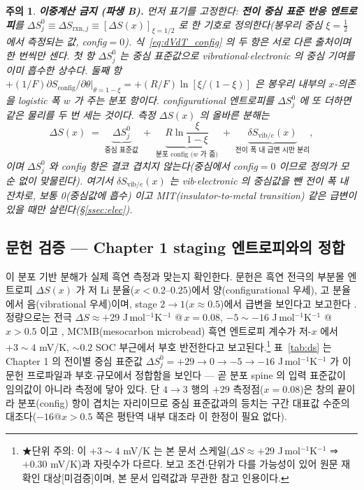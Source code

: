 \documentclass[11pt,a4paper]{article}
\newtheorem*{warnbox}{주의}
\newcommand{\rxn}{\mathrm{rxn}}
\newcommand{\config}{\mathrm{config}}
\newcommand{\vib}{\mathrm{vib}}
\begin{document}
\begin{warnbox}
\textbf{이중계산 금지 (파생 B).} 먼저 표기를 고정한다: \textbf{전이 중심 표준 반응 엔트로피}를
$\Delta S^0_j\equiv\Delta S_{\rxn,j}\equiv[\Delta S(x)]_{\xi=1/2}$ 로 한 기호로 정의한다(봉우리 중심 $\xi=\tfrac12$
에서 측정되는 값, config$=0$). 식~\eqref{eq:dVdT_config} 의 두 항은 \emph{서로 다른 출처}이며 한 번씩만 센다.
첫 항 $\Delta S^0_j$ 는 중심 표준값으로 vibrational$\cdot$electronic 의 중심 기여를 이미 흡수한 상수다. 둘째 항
$+(1/F)\partial S_\config/\partial\theta|_{\theta=1-\xi}=+(R/F)\ln[\xi/(1-\xi)]$ 은 봉우리 \emph{내부}의 $x$-의존을
logistic 폭 $w$ 가 주는 \emph{분포 항}이다. configurational 엔트로피를 $\Delta S^0_j$ 에 \emph{또} 더하면 같은
물리를 두 번 세는 것이다. 측정 $\Delta S(x)$ 의 올바른 분해는
\[
\Delta S(x) \;=\; \underbrace{\Delta S^0_j}_{\text{중심 표준값}}
\;+\;\underbrace{R\ln\frac{\xi}{1-\xi}}_{\text{분포 config (}w\text{ 가 줌)}}
\;+\;\underbrace{\delta S_{\vib/e}(x)}_{\text{전이 폭 내 급변 시만 분리}},
\]
이며 $\Delta S^0_j$ 와 config 항은 결코 겹치지 않는다(중심에서 config$=0$ 이므로 정의가 모순 없이 맞물린다).
여기서 $\delta S_{\vib/e}(x)$ 는 vib$\cdot$electronic 의 \emph{중심값을 뺀} 전이 폭 내 잔차로, 보통 0(중심값에 흡수)
이고 MIT(insulator-to-metal transition) 같은 급변이 있을 때만 살린다(\S\ref{ssec:elec}).
\end{warnbox}

\subsection{문헌 검증 — Chapter 1 staging 엔트로피와의 정합}
이 분포 기반 분해가 실제 흑연 측정과 맞는지 확인한다. 문헌은 흑연 전극의 부분몰 엔트로피 $\Delta S(x)$ 가
저 Li 분율($x<0.2$--$0.25$)에서 양(configurational 우세), 고 분율에서 음(vibrational 우세)이며, stage
$2\to1$($x\approx0.5$)에서 급변을 보인다고 보고한다 \cite{reynier2003,allart2018}. 정량으로는 전극
$\Delta S\approx+29$ J\,mol$^{-1}$K$^{-1}$ @\,$x=0.08$, $-5\sim-16$ J\,mol$^{-1}$K$^{-1}$ @\,$x>0.5$ 이고
\cite{allart2018}, MCMB(mesocarbon microbead) 흑연 엔트로피 계수가 저-$x$ 에서 $+3\sim4$ mV/K,
$\sim0.2$ SOC 부근에서 부호 반전한다고 보고된다\cite{msmr_partII}.\footnote{★단위 주의: 이 $+3\sim4$ mV/K 는
본 문서 스케일($\Delta S\approx+29$ J\,mol$^{-1}$K$^{-1}$ ⇒ $+0.30$ mV/K)과 자릿수가 다르다. 보고
조건$\cdot$단위가 다를 가능성이 있어 원문 재확인 대상[미검증]이며, 본 문서 입력값과 무관한 참고 인용이다.} 표~\ref{tab:ds} 는 Chapter 1 의 전이별 중심 표준값 $\Delta S^0_j=+29\to0\to-5\to-16$
J\,mol$^{-1}$K$^{-1}$ 가 이 문헌 프로파일과 부호$\cdot$규모에서 정합함을 보인다 — 곧 분포 spine 의 입력
표준값이 임의값이 아니라 측정에 닿아 있다. 단 $4\!\to\!3$ 행의 $+29$ 측정점($x{=}0.08$)은 창의 끝이라
분포(config) 항이 겹치는 자리이므로 중심 표준값과의 등치는 구간 대표값 수준의 대조다($-16$@$x>0.5$ 쪽은
평탄역 내부 대조라 이 한정이 필요 없다).
\end{document}
